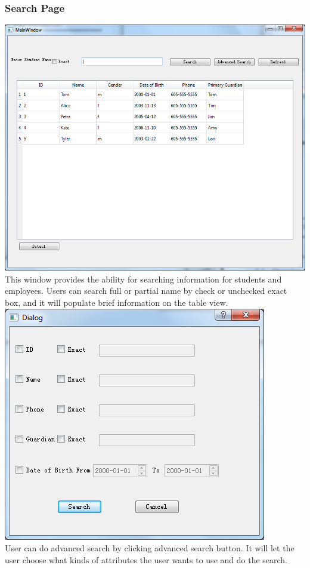 \subsubsection{Search Page}
\includegraphics[scale=0.5]{pics/search.png}\\
This window provides the ability for searching information for students and employees. Users can search full or partial name by check or unchecked exact box, and it will populate brief information on the table view.
\includegraphics[scale=0.5]{pics/adv_search.png}\\
User can do advanced search by clicking advanced search button. It will let the user choose what kinds of attributes the user wants to use and do the search.\\

